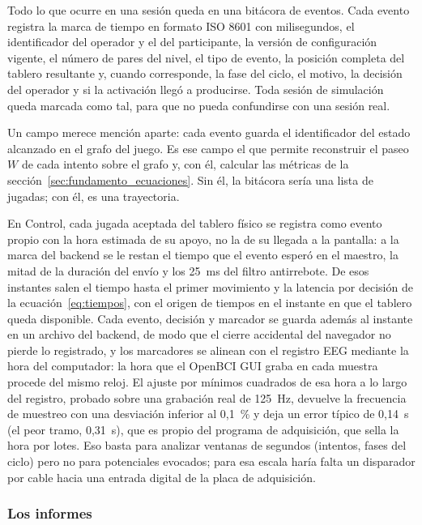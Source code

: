 \documentclass{book}
\begin{document}
Todo lo que ocurre en una sesión queda en una bitácora de eventos. Cada
evento registra la marca de tiempo en formato ISO 8601 con milisegundos,
el identificador del operador y el del participante, la versión de
configuración vigente, el número de pares del nivel, el tipo de evento, la
posición completa del tablero resultante y, cuando corresponde, la fase
del ciclo, el motivo, la decisión del operador y si la activación llegó a
producirse. Toda sesión de simulación queda marcada como tal, para que no
pueda confundirse con una sesión real.

Un campo merece mención aparte: cada evento guarda el identificador del
estado alcanzado en el grafo del juego. Es ese campo el que permite
reconstruir el paseo $W$ de cada intento sobre el grafo y, con él,
calcular las métricas de la sección~\ref{sec:fundamento_ecuaciones}. Sin
él, la bitácora sería una lista de jugadas; con él, es una trayectoria.

En Control, cada jugada aceptada del tablero físico se registra como evento propio con la hora estimada de su apoyo, no la de su llegada a la pantalla: a la marca del backend se le restan el tiempo que el evento esperó en el maestro, la mitad de la duración del envío y los 25~ms del filtro antirrebote. De esos instantes salen el tiempo hasta el primer movimiento y la latencia por decisión de la ecuación~\eqref{eq:tiempos}, con el origen de tiempos en el instante en que el tablero queda disponible. Cada evento, decisión y marcador se guarda además al instante en un archivo del backend, de modo que el cierre accidental del navegador no pierde lo registrado, y los marcadores se alinean con el registro EEG mediante la hora del computador: la hora que el OpenBCI GUI graba en cada muestra procede del mismo reloj. El ajuste por mínimos cuadrados de esa hora a lo largo del registro, probado sobre una grabación real de 125~Hz, devuelve la frecuencia de muestreo con una desviación inferior al 0,1~\% y deja un error típico de 0,14~s (el peor tramo, 0,31~s), que es propio del programa de adquisición, que sella la hora por lotes. Eso basta para analizar ventanas de segundos (intentos, fases del ciclo) pero no para potenciales evocados; para esa escala haría falta un disparador por cable hacia una entrada digital de la placa de adquisición.

\subsubsection{Los informes}
\end{document}
